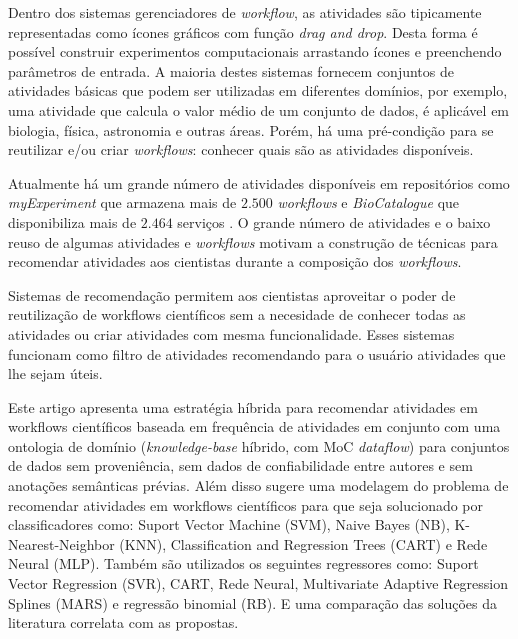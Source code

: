\documentclass[10pt]{article}
\begin{document}
Dentro dos sistemas gerenciadores de \textit{workflow}, as atividades s{\~a}o tipicamente representadas como {\'i}cones gr{\'a}ficos com fun\c{c}{\~a}o \textit{drag and drop}. Desta forma {\'e} poss{\'i}vel construir experimentos computacionais arrastando {\'i}cones e preenchendo par{\^a}metros de entrada. A maioria destes sistemas fornecem conjuntos de atividades b{\'a}sicas que podem ser utilizadas em diferentes dom{\'i}nios, por exemplo, uma atividade que calcula o valor m{\'e}dio de um conjunto de dados, {\'e} aplic{\'a}vel em biologia, f{\'i}sica, astronomia e outras {\'a}reas. Por{\'e}m, h{\'a} uma pr{\'e}-condi\c{c}{\~a}o para se reutilizar e/ou criar \textit{workflows}: conhecer quais s{\~a}o as atividades dispon{\'i}veis.


Atualmente h{\'a} um grande n{\'u}mero de atividades dispon{\'i}veis em reposit{\'o}rios como \emph{myExperiment} que armazena mais de \(2.500\) \emph{workflows} \cite{myExperiment} e \emph{BioCatalogue} que disponibiliza mais de \(2.464\) servi\c{c}os \cite{Biocatalogue}. O grande n{\'u}mero de atividades e o baixo reuso de algumas atividades e \emph{workflows} \cite{Wang2010} motivam a constru\c{c}{\~a}o de t{\'e}cnicas para recomendar atividades aos cientistas durante a composi\c{c}{\~a}o dos \emph{workflows}.


Sistemas de recomenda\c{c}{\~a}o permitem aos cientistas aproveitar o poder de reutiliza\c{c}{\~a}o de workflows cient{\'i}ficos sem a necesidade de conhecer todas as atividades ou criar atividades com mesma funcionalidade. Esses sistemas funcionam como filtro de atividades recomendando para o usu{\'a}rio atividades que lhe sejam {\'u}teis. 


Este artigo \cite{Uschold95} apresenta uma estrat{\'e}gia h{\'i}brida para recomendar atividades em workflows cient{\'i}ficos baseada em frequ{\^e}ncia de atividades em conjunto com uma ontologia de dom{\'i}nio (\emph{knowledge-base} h{\'i}brido, com MoC \emph{dataflow}) para conjuntos de dados sem proveni{\^e}ncia, sem dados de confiabilidade entre autores e sem anota\c{c}{\~o}es sem{\^a}nticas pr{\'e}vias. Al{\'e}m disso  sugere uma modelagem do problema de recomendar atividades em workflows cient{\'i}ficos para que seja solucionado por classificadores como: Suport Vector Machine (SVM), Naive Bayes (NB), K-Nearest-Neighbor (KNN), Classification and Regression Trees (CART) e Rede Neural (MLP). Tamb{\'e}m s{\~a}o utilizados os seguintes regressores como: Suport Vector Regression (SVR), CART, Rede Neural, Multivariate Adaptive Regression Splines (MARS) e regress{\~a}o binomial (RB). E uma compara\c{c}{\~a}o das solu\c{c}{\~o}es da literatura correlata com as propostas.
\end{document}

